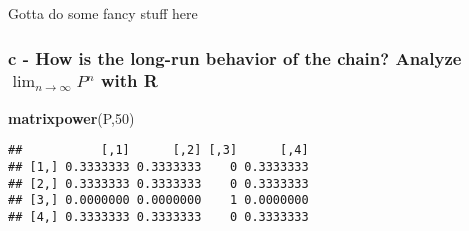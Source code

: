 \documentclass[]{article}
\newenvironment{Shaded}{\begin{snugshade}}{\end{snugshade}}
\newcommand{\DecValTok}[1]{\textcolor[rgb]{0.00,0.00,0.81}{#1}}
\newcommand{\KeywordTok}[1]{\textcolor[rgb]{0.13,0.29,0.53}{\textbf{#1}}}
\newcommand{\NormalTok}[1]{#1}
\begin{document}
Gotta do some fancy stuff here

\newpage

\hypertarget{c---how-is-the-long-run-behavior-of-the-chain-analyze-lim_ntoinfty-pn-with-r}{%
\subsubsection{\texorpdfstring{c - How is the long-run behavior of the
chain? Analyze \(\lim_{n\to\infty} P^{n}\) with
R}{c - How is the long-run behavior of the chain? Analyze \textbackslash{}lim\_\{n\textbackslash{}to\textbackslash{}infty\} P\^{}\{n\} with R}}\label{c---how-is-the-long-run-behavior-of-the-chain-analyze-lim_ntoinfty-pn-with-r}}

\begin{Shaded}
\begin{Highlighting}[]
\KeywordTok{matrixpower}\NormalTok{(P,}\DecValTok{50}\NormalTok{)}
\end{Highlighting}
\end{Shaded}

\begin{verbatim}
##           [,1]      [,2] [,3]      [,4]
## [1,] 0.3333333 0.3333333    0 0.3333333
## [2,] 0.3333333 0.3333333    0 0.3333333
## [3,] 0.0000000 0.0000000    1 0.0000000
## [4,] 0.3333333 0.3333333    0 0.3333333
\end{verbatim}
\end{document}
